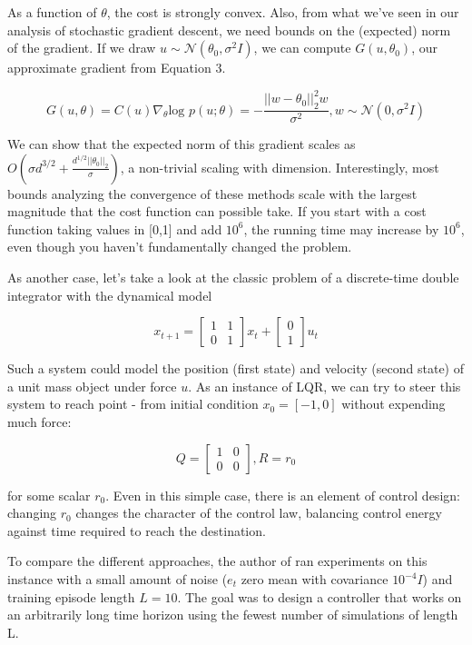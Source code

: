 \documentclass{article}[12pt]
\begin{document}
As a function of $\theta$, the cost is strongly convex. Also, from what we've seen in our analysis of stochastic gradient descent, we need bounds on the (expected) norm of the gradient. If we draw $u \sim \mathcal{N}(\theta_0,\sigma^2 I)$, we can compute $G(u,\theta_0)$, our approximate gradient from Equation 3.

$$G(u,\theta) =  C(u)\nabla_\theta\text{log } p(u;\theta) = - \frac{||w-\theta_0||_2^2w}{\sigma^2}, w\sim\mathcal{N}(0,\sigma^2I)$$

We can show that the expected norm of this gradient scales as $O(\sigma d^{3/2} + \frac{d^{1/2}||\theta_0||_2}{\sigma})$, a non-trivial scaling with dimension. Interestingly, most bounds analyzing the convergence of these methods scale with the largest magnitude that the cost function can possible take. If you start with a cost function taking values in [0,1] and add $10^6$, the running time may increase by $10^6$, even though you haven't fundamentally changed the problem.

As another case, let's take a look at the classic problem of a discrete-time double integrator with the dynamical model 

\[
x_{t+1} = 
\begin{bmatrix}
1 & 1 \\ 
0 & 1
\end{bmatrix}
x_t + 
\begin{bmatrix}
0\\ 
1
\end{bmatrix}
u_t
\]

Such a system could model the position (first state) and velocity (second state) of a unit mass object under force $u$.
As an instance of LQR, we can try to steer this system to reach point - from initial condition $x_0 = [-1,0]$ without expending much force:

\[Q = 
\begin{bmatrix}
1 & 0 \\ 
0 & 0
\end{bmatrix}
, R = r_0
\]

for some scalar $r_0$. Even in this simple case, there is an element of control design: changing $r_0$ changes the character of the control law, balancing control energy against time required to reach the destination.

To compare the different approaches, the author of \cite{Recht2019} ran experiments on this instance with a small amount of noise ($e_t$ zero mean with covariance $10^{-4}I$) and training episode length $L = 10$. The goal was to design a controller that works on an arbitrarily long time horizon using the fewest number of simulations of length L.
\end{document}
